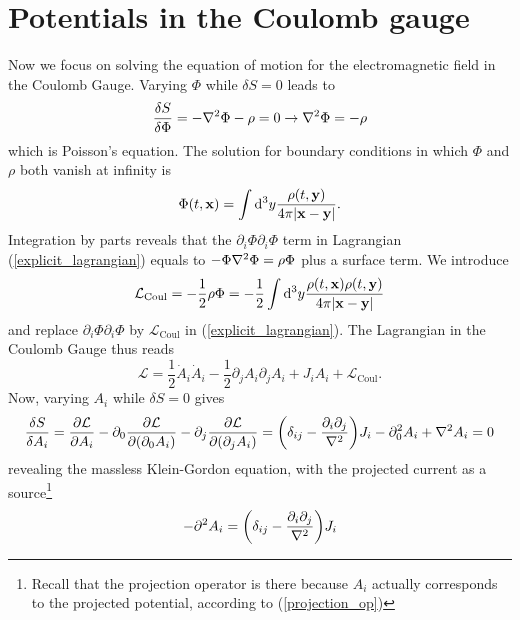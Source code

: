\section{Potentials in the Coulomb gauge}
Now we focus on solving the equation of motion for the electromagnetic field in the Coulomb Gauge. Varying $\Phi$ while $\delta S=0$ leads to
\begin{equation}
    \fdv{S}{\Phi}=-\laplacian\Phi-\rho=0\to \laplacian\Phi=-\rho
\end{equation}
which is Poisson's equation. The solution for boundary conditions in which $\Phi$ and $\rho$ both vanish at infinity is
\begin{equation}
    \Phi(t,\vb{x})=\int\dd^3 y\frac{\rho(t,\vb{y})}{4\pi\abs{\vb{x-y}}}.
    \label{scalar_potential}
\end{equation}
Integration by parts reveals that the $\partial_i\Phi\partial_i\Phi$ term in Lagrangian (\ref{explicit_lagrangian}) equals to $-\Phi\laplacian\Phi=\rho\Phi$ plus a surface term. We introduce
\begin{equation}
    \mathcal{L}_{\text{Coul}}=-\frac{1}{2}\rho\Phi=-\frac{1}{2}\int\dd^3 y \frac{\rho(t,\vb{x})\rho(t,\vb{y})}{4\pi\abs{\vb{x}-\vb{y}}}
\end{equation}
and replace $\partial_i\Phi\partial_i\Phi$ by $\mathcal{L}_{\text{Coul}}$ in (\ref{explicit_lagrangian}). The Lagrangian in the Coulomb Gauge thus reads
\begin{equation}
    \mathcal{L}=\frac{1}{2}\dot{A}_i\dot{A}_i-\frac{1}{2}\partial_jA_i\partial_jA_i+J_iA_i+\mathcal{L}_{\text{Coul}}.
\end{equation}
Now, varying $A_i$ while $\delta S=0$ gives
\begin{equation}
    \begin{aligned}
        \fdv{S}{A_i}=\pdv{\mathcal{L}}{A_i}-\partial_0\pdv{\mathcal{L}}{(\partial_0A_i)}-\partial_j\pdv{\mathcal{L}}{(\partial_jA_i)}=        \qty(\delta_{ij}-\frac{\partial_i\partial_j}{\laplacian})J_i-\partial_0^2A_i+\laplacian A_i=0
\end{aligned}
\end{equation}
revealing the massless Klein-Gordon equation, with the projected current as a source\footnote{Recall that the projection operator is there because $A_i$ actually corresponds to the projected potential, according to (\ref{projection_op})}
\begin{equation}
        -\partial^2A_i=\qty(\delta_{ij}-\frac{\partial_i\partial_j}{\laplacian})J_i
\end{equation}
